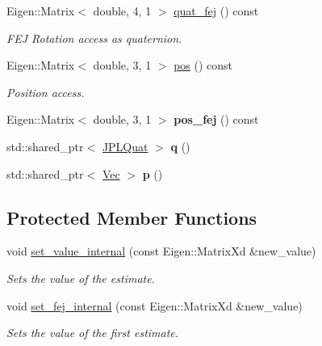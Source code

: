 \begin{DoxyCompactItemize}
\mbox{\label{classov__type_1_1PoseJPL_aa1bb71fdf85190373629e8a2ac818205}} 
Eigen\+::\+Matrix$<$ double, 4, 1 $>$ \hyperlink{classov__type_1_1PoseJPL_aa1bb71fdf85190373629e8a2ac818205}{quat\+\_\+fej} () const
\begin{DoxyCompactList}\small\item\em F\+EJ Rotation access as quaternion. \end{DoxyCompactList}\item 
\mbox{\label{classov__type_1_1PoseJPL_ae1f0b41d18b5307e9d035d05abf91c68}} 
Eigen\+::\+Matrix$<$ double, 3, 1 $>$ \hyperlink{classov__type_1_1PoseJPL_ae1f0b41d18b5307e9d035d05abf91c68}{pos} () const
\begin{DoxyCompactList}\small\item\em Position access. \end{DoxyCompactList}\item 
\mbox{\label{classov__type_1_1PoseJPL_a6cdf8ee3cfefe564eb01e4b9367a04f6}} 
Eigen\+::\+Matrix$<$ double, 3, 1 $>$ {\bfseries pos\+\_\+fej} () const
\item 
\mbox{\label{classov__type_1_1PoseJPL_a2e6896246cfdba377cd75444f44a8868}} 
std\+::shared\+\_\+ptr$<$ \hyperlink{classov__type_1_1JPLQuat}{J\+P\+L\+Quat} $>$ {\bfseries q} ()
\item 
\mbox{\label{classov__type_1_1PoseJPL_a428675563a664d2f1e3adf333762a022}} 
std\+::shared\+\_\+ptr$<$ \hyperlink{classov__type_1_1Vec}{Vec} $>$ {\bfseries p} ()
\end{DoxyCompactItemize}
\subsection*{Protected Member Functions}
\begin{DoxyCompactItemize}
\item 
void \hyperlink{classov__type_1_1PoseJPL_ab1a626a94a9c7013a253dd16a2b6a0cc}{set\+\_\+value\+\_\+internal} (const Eigen\+::\+Matrix\+Xd \&new\+\_\+value)
\begin{DoxyCompactList}\small\item\em Sets the value of the estimate. \end{DoxyCompactList}\item 
void \hyperlink{classov__type_1_1PoseJPL_a779b5bce92981b57b018ab5c14cf4b99}{set\+\_\+fej\+\_\+internal} (const Eigen\+::\+Matrix\+Xd \&new\+\_\+value)
\begin{DoxyCompactList}\small\item\em Sets the value of the first estimate. \end{DoxyCompactList}\end{DoxyCompactItemize}
